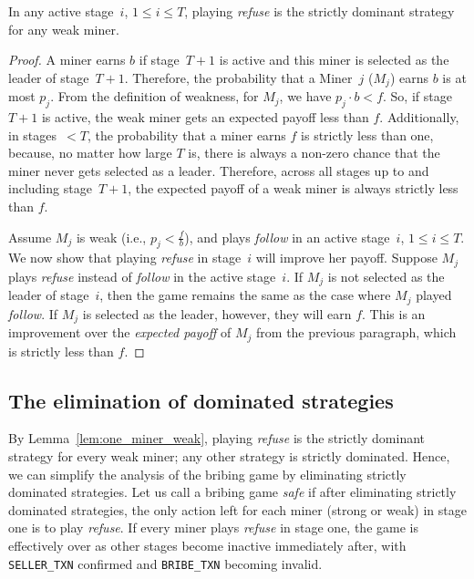 \documentclass[runningheads]{llncs}
\newcommand{\sellertxn}{\texttt{SELLER\_TXN}}
\newcommand{\bribetxn}{\texttt{BRIBE\_TXN}}
\newcommand{\refuse}{\emph{refuse}}
\newcommand{\follow}{\emph{follow}}
\begin{document}
\begin{lemma}
\label{lem:one_miner_weak}
  In any active stage~$i$, $1\leq i \leq T$, playing \refuse{} is the strictly dominant strategy for any weak miner.
\end{lemma}
\begin{proof}
    A miner earns $b$ if stage~$T+1$ is active and this miner is selected as the leader of stage~$T+1$. Therefore, the probability that a Miner~$j$ ($M_j$) earns $b$ is at most $p_j$. From the definition of weakness, for $M_j$, we have $p_j \cdot b<f$. So, if stage~$T+1$ is active, the weak miner gets an expected payoff less than $f$. Additionally, in stages~$<T$, the probability that a miner earns $f$ is strictly less than one, because, no matter how large $T$ is, there is always a non-zero chance that the miner never gets selected as a leader. Therefore, across all stages up to and including stage~$T+1$, the expected payoff of a weak miner is always strictly less than $f$. 
    
    Assume $M_j$ is weak (i.e., $p_j<\frac{f}{b}$), and plays \follow{} in an active stage~$i$, $1\leq i \leq T$. We now show that playing \refuse{} in stage~$i$ will improve her payoff. Suppose $M_j$ plays \refuse{} instead of \follow{} in the active stage~$i$. If $M_j$ is not selected as the leader of stage~$i$, then the game remains the same as the case where $M_j$ played \follow{}. If $M_j$ is selected as the leader, however, they will earn $f$. This is an improvement over the \emph{expected payoff} of $M_j$ from the previous paragraph, which is strictly less than $f$.
 
\end{proof} 

\subsection{The elimination of dominated strategies} \label{ss:iterated_elimination_of_dominated_strategies} 
By Lemma~\ref{lem:one_miner_weak}, playing \refuse{} is the strictly dominant strategy for every weak miner; any other strategy is strictly dominated. Hence, we can simplify the analysis of the bribing game by eliminating strictly dominated strategies. Let us call a bribing game \emph{safe} if after eliminating strictly dominated strategies, the only action left for each miner (strong or weak) in stage one is to play \refuse{}. If every miner plays \refuse{} in stage one, the game is effectively over as other stages become inactive immediately after, with \sellertxn{} confirmed and \bribetxn{} becoming invalid.
\end{document}

